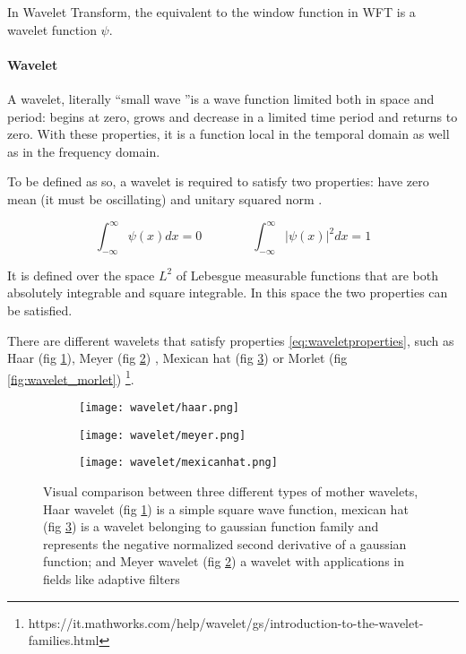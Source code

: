\documentclass[11pt]{report}
\begin{document}
In Wavelet Transform, the equivalent to the window function in WFT is a wavelet function $\psi$.

\paragraph{Wavelet} \hfill

A wavelet, literally \textquotedblleft small wave \textquotedblright is a wave function limited both in space and period: begins at zero, grows and decrease in a limited time period and returns to zero. With these properties, it is a function local in the temporal domain as well as in the frequency domain.

To be defined as so, a wavelet is required to satisfy two properties: have zero mean (it must be oscillating) and unitary squared norm \cite{percival-2013}.

\begin{equation}\label{eq:waveletproperties}
\int_{-\infty}^{\infty}\psi(x)dx = 0 \qquad \qquad  \int_{-\infty}^{\infty} |\psi(x)|^2 dx = 1
\end{equation}

It is defined over the space $L^2$ of Lebesgue measurable functions that are both absolutely integrable and square integrable. In this space the two properties can be satisfied.

There are different wavelets that satisfy properties \ref{eq:waveletproperties}, such as Haar (fig \ref{fig:wavelet_haar}), Meyer (fig \ref{fig:wavelet_meyer}) \cite{dabauchies-1992}, Mexican hat (fig \ref{fig:wavelet_mexicanhat}) or Morlet (fig \ref{fig:wavelet_morlet}) \footnote{https://it.mathworks.com/help/wavelet/gs/introduction-to-the-wavelet-families.html}.



\begin{figure}
\begin{subfigure}{0.3\textwidth}
\texttt{[image: wavelet/haar.png]}
\caption{}
\label{fig:wavelet_haar}
\end{subfigure}
\begin{subfigure}{0.3\textwidth}
\texttt{[image: wavelet/meyer.png]}
\caption{}
\label{fig:wavelet_meyer}
\end{subfigure}
\begin{subfigure}{0.3\textwidth}
\texttt{[image: wavelet/mexicanhat.png]}
\caption{}
\label{fig:wavelet_mexicanhat}
\end{subfigure}
\caption{Visual comparison between three different types of mother wavelets, Haar wavelet (fig \ref{fig:wavelet_haar}) is a simple square wave function, mexican hat (fig \ref{fig:wavelet_mexicanhat}) is a wavelet belonging to gaussian function family and represents the negative normalized second derivative of a gaussian function; and Meyer wavelet (fig \ref{fig:wavelet_meyer}) a wavelet with applications in fields like adaptive filters}
\label{fig:different_wavelets}
\end{figure}
\end{document}

